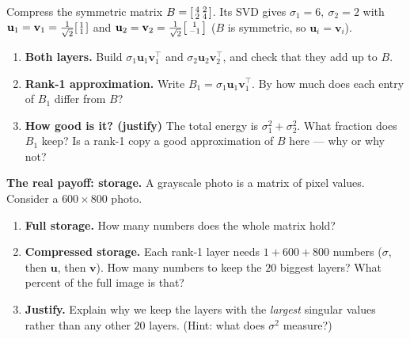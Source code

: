 \documentclass[10pt]{article}
\newcommand{\uu}{\mathbf{u}}
\newcommand{\vv}{\mathbf{v}}
\newcommand{\T}{^{\top}}
\begin{document}
\begin{tcolorbox}[colback=white, colframe=black!40, title=\textbf{Tier A --- Approaching Proficiency},
    fonttitle=\bfseries, arc=1.5mm, left=3mm, right=3mm, top=2mm, bottom=2mm, breakable]
Compress the symmetric matrix $B=\begin{bsmallmatrix} 4 & 2\\ 2 & 4 \end{bsmallmatrix}$. Its SVD gives
$\sigma_1=6,\ \sigma_2=2$ with $\uu_1=\vv_1=\tfrac1{\sqrt2}\begin{bsmallmatrix} 1\\1 \end{bsmallmatrix}$ and
$\uu_2=\vv_2=\tfrac1{\sqrt2}\begin{bsmallmatrix} 1\\-1 \end{bsmallmatrix}$ ($B$ is symmetric, so $\uu_i=\vv_i$).
\begin{enumerate}[leftmargin=1.7em, itemsep=9pt]
  \item \textbf{Both layers.} Build $\sigma_1\uu_1\vv_1\T$ and $\sigma_2\uu_2\vv_2\T$, and check that they add up to $B$. 
  \item \textbf{Rank-1 approximation.} Write $B_1=\sigma_1\uu_1\vv_1\T$. By how much does each entry of $B_1$ differ from $B$? \writeline
  \item \textbf{How good is it? (justify)} The total energy is $\sigma_1^2+\sigma_2^2$. What fraction does $B_1$ keep? Is a rank-1 copy a good approximation of $B$ here --- why or why not? \writeline
\end{enumerate}
\end{tcolorbox}

\begin{tcolorbox}[colback=white, colframe=black!40, title=\textbf{Tier E --- Extension},
    fonttitle=\bfseries, arc=1.5mm, left=3mm, right=3mm, top=2mm, bottom=2mm, breakable]
\textbf{The real payoff: storage.} A grayscale photo is a matrix of pixel values. Consider a
$600\times800$ photo.
\begin{enumerate}[leftmargin=1.7em, itemsep=9pt]
  \item \textbf{Full storage.} How many numbers does the whole matrix hold? \blank{2.6cm}
  \item \textbf{Compressed storage.} Each rank-1 layer needs $1+600+800$ numbers ($\sigma$, then $\uu$, then $\vv$). How many numbers to keep the $20$ biggest layers? What percent of the full image is that? \writeline
  \item \textbf{Justify.} Explain why we keep the layers with the \emph{largest} singular values rather than any other $20$ layers. (Hint: what does $\sigma^2$ measure?) \writeline
\end{enumerate}
\end{tcolorbox}
\end{document}
